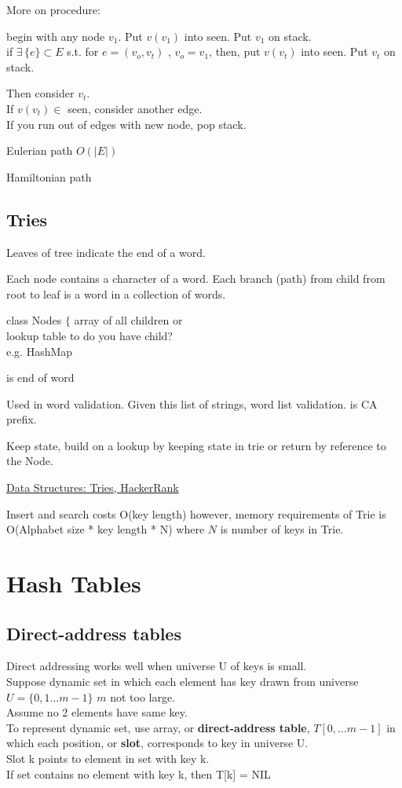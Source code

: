 \documentclass[10pt]{amsart}
\begin{document}
\begin{multicols*}{2}
More on procedure:

begin with any node $v_1$. Put $v(v_1)$ into seen. Put $v_1$ on stack. \\
if $\exists \, \lbrace e \rbrace \subset E$ s.t. for $e = (v_o, v_t)$ , $v_o = v_1$, then, put $v(v_t)$ into seen. Put $v_t$ on stack.

Then consider $v_t$. \\
If $v(v_t) \in $ seen, consider another edge. \\
If you run out of edges with new node, pop stack. 

Eulerian path $O(|E|) $ 

Hamiltonian path


\subsection{Tries}

Leaves of tree indicate the end of a word.

Each node contains a character of a word. Each branch (path) from child from root to leaf is a word in a collection of words. 

class Nodes $\lbrace $ array of all children or \\
lookup table to do you have child? \\
e.g. HashMap

is end of word

Used in word validation. Given this list of strings, word list validation.
is CA prefix.

Keep state, build on a lookup by keeping state in trie or return by reference to the Node.

\href{https://youtu.be/zIjfhVPRZCg}{Data Structures: Tries, HackerRank}

Insert and search costs O(key length) however, memory requirements of Trie is O(Alphabet size * key length * N) where $N$ is number of keys in Trie.

\section{Hash Tables}

\subsection{Direct-address tables}

Direct addressing works well when universe U of keys is small. \\
Suppose dynamic set in which each element has key drawn from universe $U = \lbrace 0 , 1 \dots m - 1 \rbrace$ $m$ not too large. \\
Assume no 2 elements have same key. \\
To represent dynamic set, use array, or \textbf{direct-address table}, $T[0, \dots m-1]$ in which each position, or \textbf{slot}, corresponds to key in universe U. \\
Slot k points to element in set with key k. \\
If set contains no element with key k, then T[k] = NIL \\


\end{multicols*}
\end{document}
